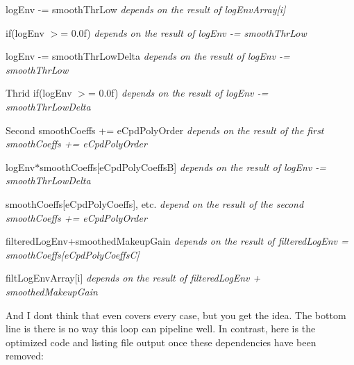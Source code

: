 \begin{DoxyItemize}
\item {\ttfamily log\+Env -\/= smooth\+Thr\+Low }  {\itshape  depends on the result of {\ttfamily log\+Env\+Array\mbox{[}i\mbox{]}}} {\ttfamily }  


\item {\ttfamily if(log\+Env $>$= 0.\+0f) }  {\itshape  depends on the result of {\ttfamily log\+Env -\/= smooth\+Thr\+Low}} {\ttfamily }  


\item {\ttfamily log\+Env -\/= smooth\+Thr\+Low\+Delta }  {\itshape  depends on the result of {\ttfamily log\+Env -\/= smooth\+Thr\+Low}} {\ttfamily }  


\item {\ttfamily Thrid if(log\+Env $>$= 0.\+0f) }  {\itshape  depends on the result of {\ttfamily log\+Env -\/= smooth\+Thr\+Low\+Delta}} {\ttfamily }  


\item {\ttfamily Second smooth\+Coeffs += e\+Cpd\+Poly\+Order }  {\itshape  depends on the result of the first {\ttfamily smooth\+Coeffs += e\+Cpd\+Poly\+Order}} {\ttfamily }  


\item {\ttfamily log\+Env$\ast$smooth\+Coeffs\mbox{[}e\+Cpd\+Poly\+Coeffs\+B\mbox{]} }  {\itshape  depends on the result of {\ttfamily log\+Env -\/= smooth\+Thr\+Low\+Delta}} {\ttfamily }  


\item {\ttfamily smooth\+Coeffs\mbox{[}e\+Cpd\+Poly\+Coeffs\mbox{]}, etc. }  {\itshape  depend on the result of the second {\ttfamily smooth\+Coeffs += e\+Cpd\+Poly\+Order}} {\ttfamily }  


\item {\ttfamily filtered\+Log\+Env+smoothed\+Makeup\+Gain }  {\itshape  depends on the result of {\ttfamily filtered\+Log\+Env = smooth\+Coeffs\mbox{[}e\+Cpd\+Poly\+Coeffs\+C\mbox{]}}}  


\item {\ttfamily filt\+Log\+Env\+Array\mbox{[}i\mbox{]} }  {\itshape  depends on the result of {\ttfamily filtered\+Log\+Env + smoothed\+Makeup\+Gain}}  


\end{DoxyItemize}

And I don\textquotesingle{}t think that even covers every case, but you get the idea. The bottom line is there is no way this loop can pipeline well. In contrast, here is the optimized code and listing file output once these dependencies have been removed\+:


